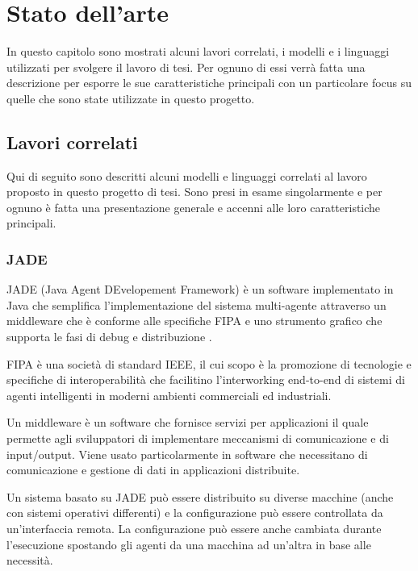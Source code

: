 \chapter{Stato dell'arte}\label{chap:soa}
\lhead[\fancyplain{}{\bfseries\thepage}]{\fancyplain{}{\bfseries\rightmark}}

In questo capitolo sono mostrati alcuni lavori correlati, i modelli e i linguaggi utilizzati per svolgere il lavoro di tesi. Per ognuno di essi verrà fatta una descrizione per esporre le sue caratteristiche principali con un particolare focus su quelle che sono state utilizzate in questo progetto.

\section{Lavori correlati}
Qui di seguito sono descritti alcuni modelli e linguaggi correlati al lavoro proposto in questo progetto di tesi. Sono presi in esame singolarmente e per ognuno è fatta una presentazione generale e accenni alle loro caratteristiche principali.

\subsection*{JADE}
JADE (Java Agent DEvelopement Framework) è un software implementato in Java che semplifica l'implementazione del sistema multi-agente attraverso un middleware che è conforme alle specifiche FIPA e uno strumento grafico che supporta le fasi di debug e distribuzione \cite{JADE}.

FIPA è una società di standard IEEE, il cui scopo è la promozione di tecnologie e specifiche di interoperabilità che facilitino l'interworking end-to-end di sistemi di agenti intelligenti in moderni ambienti commerciali ed industriali.

Un middleware è un software che fornisce servizi per applicazioni il quale permette agli sviluppatori di implementare meccanismi di comunicazione e di input/output. Viene usato particolarmente in software che necessitano di comunicazione e gestione di dati in applicazioni distribuite.

Un sistema basato su JADE può essere distribuito su diverse macchine (anche con sistemi operativi differenti) e la configurazione può essere controllata da un'interfaccia remota. La configurazione può essere anche cambiata durante l'esecuzione spostando gli agenti da una macchina ad un'altra in base alle necessità.

